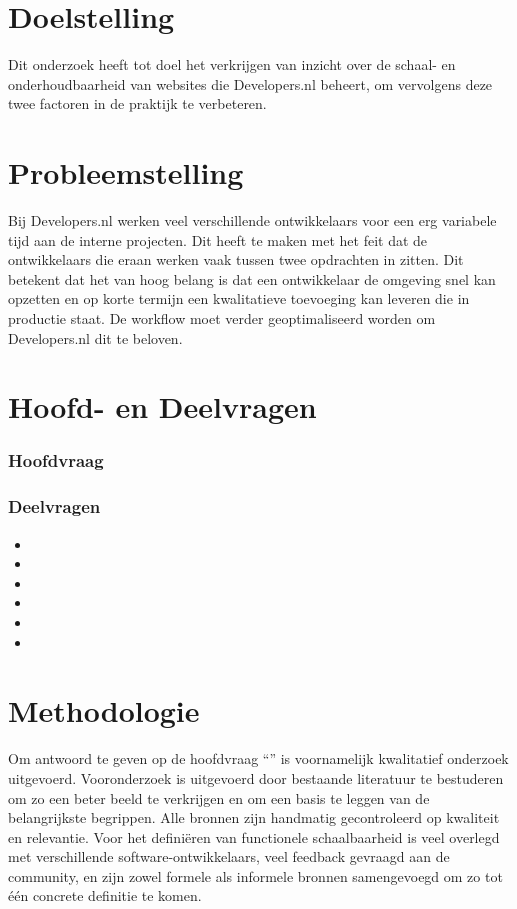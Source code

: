 \section{Doelstelling}
Dit onderzoek heeft tot doel het verkrijgen van inzicht over de schaal- en onderhoudbaarheid van websites die Developers.nl beheert, om vervolgens deze twee factoren in de praktijk te verbeteren.

\section{Probleemstelling}
Bij Developers.nl werken veel verschillende ontwikkelaars voor een erg variabele tijd aan de interne projecten. Dit heeft te maken met het feit dat de ontwikkelaars die eraan werken vaak tussen twee opdrachten in zitten. Dit betekent dat het van hoog belang is dat een ontwikkelaar de omgeving snel kan opzetten en op korte termijn een kwalitatieve toevoeging kan leveren die in productie staat. De workflow moet verder geoptimaliseerd worden om Developers.nl dit te beloven.

\section{Hoofd- en Deelvragen}
\subsubsection{Hoofdvraag}
\hoofdvraagname

\subsubsection{Deelvragen}
\begin{itemize}
	\item \deelverwachtingen
	\item \deeltechnieken
	\item \deelhuidig
	\item \deelverbetering
	\item \deelimplementatie
	\item \deelrequirements
\end{itemize}

\section{Methodologie}
Om antwoord te geven op de hoofdvraag \enquote{\hoofdvraagname} is voornamelijk kwalitatief onderzoek uitgevoerd. Vooronderzoek is uitgevoerd door bestaande literatuur te bestuderen om zo een beter beeld te verkrijgen en om een basis te leggen van de belangrijkste begrippen. Alle bronnen zijn handmatig gecontroleerd op kwaliteit en relevantie. Voor het definiëren van functionele schaalbaarheid is veel overlegd met verschillende software-ontwikkelaars, veel feedback gevraagd aan de community, en zijn zowel formele als informele bronnen samengevoegd om zo tot één concrete definitie te komen. 


